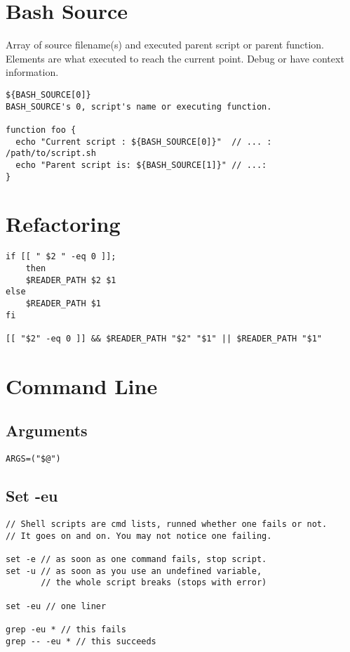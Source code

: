 \section{Bash Source}

Array of source filename(s) and executed parent script or parent function.
Elements are what executed to reach the current point.
Debug or have context information.

\begin{verbatim}
${BASH_SOURCE[0]}
BASH_SOURCE's 0, script's name or executing function.

function foo {
  echo "Current script : ${BASH_SOURCE[0]}"  // ... : /path/to/script.sh
  echo "Parent script is: ${BASH_SOURCE[1]}" // ...: 
}
\end{verbatim}

\section{Refactoring}

\begin{verbatim}
if [[ " $2 " -eq 0 ]];
    then
    $READER_PATH $2 $1
else
    $READER_PATH $1
fi

[[ "$2" -eq 0 ]] && $READER_PATH "$2" "$1" || $READER_PATH "$1"
\end{verbatim}

\section{Command Line}

\subsection{Arguments}

\begin{verbatim}
ARGS=("$@")
\end{verbatim}

\subsection{Set -eu}

\begin{verbatim}
// Shell scripts are cmd lists, runned whether one fails or not.
// It goes on and on. You may not notice one failing. 

set -e // as soon as one command fails, stop script. 
set -u // as soon as you use an undefined variable, 
       // the whole script breaks (stops with error)

set -eu // one liner

grep -eu * // this fails
grep -- -eu * // this succeeds
\end{verbatim}

